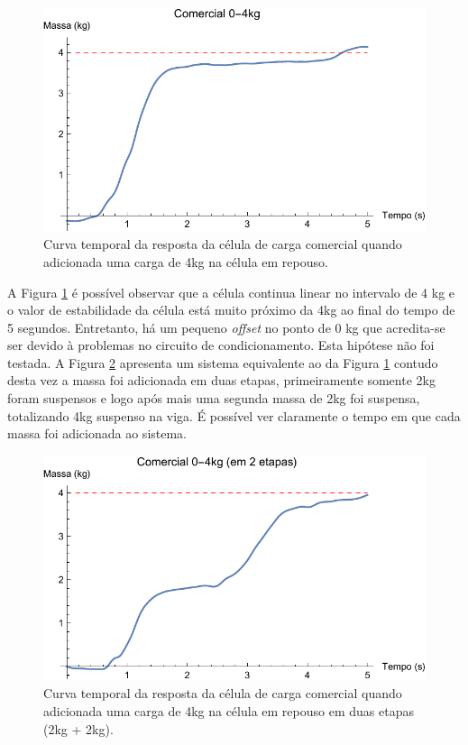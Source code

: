 \documentclass[a4paper]{instrumentacao}
\begin{document}
\begin{figure}[H]
\center
\includegraphics[width=\textwidth]{Comercial_0-4kg.pdf}
\caption{Curva temporal da resposta da célula de carga comercial quando adicionada uma carga de 4kg na célula em repouso.}
\label{fig:celula-comercial-resultado-0-4kg}
\end{figure}

A Figura \ref{fig:celula-comercial-resultado-0-4kg} é possível observar que a célula continua linear no intervalo de 4 kg e o valor de estabilidade da célula está muito próximo da 4kg ao final do tempo de 5 segundos. Entretanto, há um pequeno \textit{offset} no ponto de 0 kg que acredita-se ser devido à problemas no circuito de condicionamento. Esta hipótese não foi testada. A Figura \ref{fig:celula-comercial-resultado-0-4kg-etapa} apresenta um sistema equivalente ao da Figura \ref{fig:celula-comercial-resultado-0-4kg} contudo desta vez a massa foi adicionada em duas etapas, primeiramente somente 2kg foram suspensos e logo após mais uma segunda massa de 2kg foi suspensa, totalizando 4kg suspenso na viga. É possível ver claramente o tempo em que cada massa foi adicionada ao sistema.

\begin{figure}[H]
\center
\includegraphics[width=\textwidth]{Comercial_0-4kg_etapa.pdf}
\caption{Curva temporal da resposta da célula de carga comercial quando adicionada uma carga de 4kg na célula em repouso em duas etapas (2kg + 2kg).}
\label{fig:celula-comercial-resultado-0-4kg-etapa}
\end{figure} 
\end{document}

